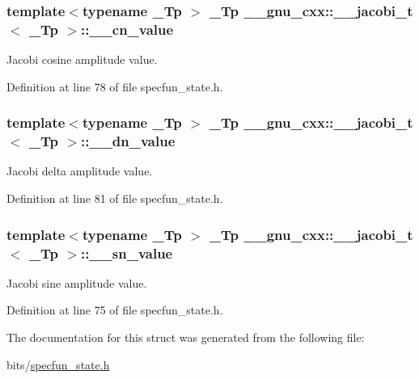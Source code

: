 \subsubsection[{\texorpdfstring{\+\_\+\+\_\+cn\+\_\+value}{__cn_value}}]{\setlength{\rightskip}{0pt plus 5cm}template$<$typename \+\_\+\+Tp $>$ \+\_\+\+Tp {\bf \+\_\+\+\_\+gnu\+\_\+cxx\+::\+\_\+\+\_\+jacobi\+\_\+t}$<$ \+\_\+\+Tp $>$\+::\+\_\+\+\_\+cn\+\_\+value}\hypertarget{struct____gnu__cxx_1_1____jacobi__t_a33e09c9129d7632336c0cad82a77f70d}{}\label{struct____gnu__cxx_1_1____jacobi__t_a33e09c9129d7632336c0cad82a77f70d}


Jacobi cosine amplitude value. 



Definition at line 78 of file specfun\+\_\+state.\+h.

\subsubsection[{\texorpdfstring{\+\_\+\+\_\+dn\+\_\+value}{__dn_value}}]{\setlength{\rightskip}{0pt plus 5cm}template$<$typename \+\_\+\+Tp $>$ \+\_\+\+Tp {\bf \+\_\+\+\_\+gnu\+\_\+cxx\+::\+\_\+\+\_\+jacobi\+\_\+t}$<$ \+\_\+\+Tp $>$\+::\+\_\+\+\_\+dn\+\_\+value}\hypertarget{struct____gnu__cxx_1_1____jacobi__t_a82f1a7cf2781dc24279d32d489b060ea}{}\label{struct____gnu__cxx_1_1____jacobi__t_a82f1a7cf2781dc24279d32d489b060ea}


Jacobi delta amplitude value. 



Definition at line 81 of file specfun\+\_\+state.\+h.

\subsubsection[{\texorpdfstring{\+\_\+\+\_\+sn\+\_\+value}{__sn_value}}]{\setlength{\rightskip}{0pt plus 5cm}template$<$typename \+\_\+\+Tp $>$ \+\_\+\+Tp {\bf \+\_\+\+\_\+gnu\+\_\+cxx\+::\+\_\+\+\_\+jacobi\+\_\+t}$<$ \+\_\+\+Tp $>$\+::\+\_\+\+\_\+sn\+\_\+value}\hypertarget{struct____gnu__cxx_1_1____jacobi__t_a2fb539e459837b70a1ed4f2b20445d4a}{}\label{struct____gnu__cxx_1_1____jacobi__t_a2fb539e459837b70a1ed4f2b20445d4a}


Jacobi sine amplitude value. 



Definition at line 75 of file specfun\+\_\+state.\+h.



The documentation for this struct was generated from the following file\+:\begin{DoxyCompactItemize}
\item 
bits/\hyperlink{specfun__state_8h}{specfun\+\_\+state.\+h}\end{DoxyCompactItemize}
